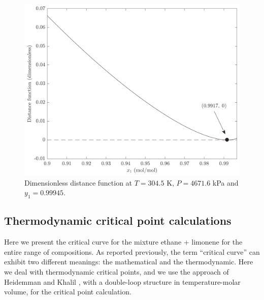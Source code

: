 \documentclass[journal=iecred,manuscript=article]{achemso}
\theoremstyle{definition}
\theoremstyle{remark}
\begin{document}
\begin{figure}
	\begin{center}
		\includegraphics[scale=0.50]{funcao_distancia.pdf}
		\caption{Dimensionless distance function at $ T = 304.5 $ K, $P = 4671.6$ kPa and $ y_{1} = 0.99945 $.}\label{fig:distance_function}
	\end{center}
\end{figure}

\subsection{Thermodynamic critical point calculations}

Here we present the critical curve for the mixture ethane + limonene for the entire range of compositions. As reported previously, the term \enquote{critical curve} can exhibit two different meanings: the mathematical  and the thermodynamic.
 Here we deal
 with thermodynamic critical points, and we use the approach of Heidemman and Khalil \citep{heidemman}, with a double-loop structure in temperature-molar volume, for the critical point calculation.
 
\end{document}
